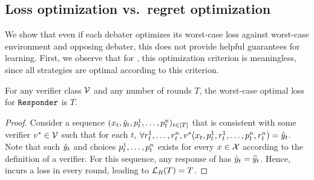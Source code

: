 \documentclass[11pt,letterpaper]{article}
\theoremstyle{definition}
\theoremstyle{plain}
\begin{document}
\subsection{Loss optimization vs.~regret optimization}

We show that even if each debater optimizes its worst-case loss against worst-case environment and opposing debater, this does not provide helpful guarantees for learning. 
First, we observe that for \dt, this optimization criterion is  meaningless, since all \dt strategies are optimal according to this criterion. 

\begin{claim}\label{claim:deb2}
    For any verifier class ${\mathcal V}$ and any number of rounds $T$, the worst-case optimal loss for $\texttt{Responder}$ is $T$. 
\end{claim}
\begin{proof}
Consider a sequence $(x_t,{\hat{y}}_t,{p}_t^1, \ldots, {p}_t^n)_{t \in [T]}$ that is consistent with some verifier $v^* \in {\mathcal V}$ such that for each $t$, $\forall {r}_t^1, \ldots, {r}_t^n, v^*(x_t, {p}_t^1,{r}_t^1, \ldots, {p}_t^n, {r}_t^n) = {\hat{y}}_t$. Note that such ${\hat{y}}_t$ and choices ${p}_t^1, \ldots, {p}_t^n$ exists for every $x \in {\mathcal X}$ according to the definition of a verifier. 
For this sequence, any response of \df has ${\hat{y}}_t = {\widetilde{y}}_t$. Hence, \df incurs a loss in every round, leading to ${{\mathcal L}_R}(T) = T$.
\end{proof}
\end{document}

